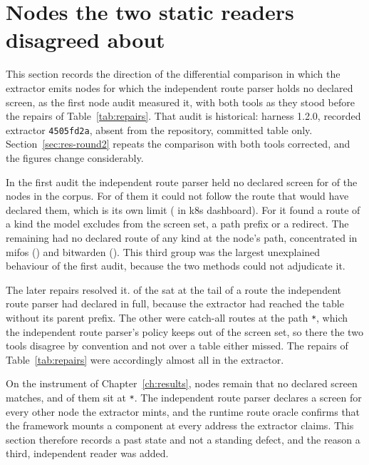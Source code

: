 \section{Nodes the two static readers disagreed about}
\label{app:readers}

This section records the direction of the differential comparison in which the extractor emits nodes for which the independent route parser holds no declared screen, as the first node audit measured it, with both tools as they stood before the repairs of Table~\ref{tab:repairs}. That audit is historical: harness 1.2.0, recorded extractor \texttt{4505fd2a}, absent from the repository, committed table only. Section~\ref{sec:res-round2} repeats the comparison with both tools corrected, and the figures change considerably.

In the first audit the independent route parser held no declared screen for \NodeAuditUnmatchedAll{} of the \NodeAuditGraphNodesAll{} nodes in the corpus. For \NodeAuditBlindAll{} of them it could not follow the route that would have declared them, which is its own limit (\NodeAuditBlindKdash{} in k8s dashboard). For \NodeAuditOutsideSAll{} it found a route of a kind the model excludes from the screen set, a path prefix or a redirect. The remaining \RoundTwoFirstRoundExtra{} had no declared route of any kind at the node's path, concentrated in mifos (\NodeAuditNoRouteMifos{}) and bitwarden (\NodeAuditNoRouteBitwarden{}). This third group was the largest unexplained behaviour of the first audit, because the two methods could not adjudicate it.

The later repairs resolved it. \RoundTwoFirstRoundTruncated{} of the \RoundTwoFirstRoundExtra{} sat at the tail of a route the independent route parser had declared in full, because the extractor had reached the table without its parent prefix. The other \RoundTwoFirstRoundSynthetic{} were catch-all routes at the path \texttt{*}, which the independent route parser's policy keeps out of the screen set, so there the two tools disagree by convention and not over a table either missed. The repairs of Table~\ref{tab:repairs} were accordingly almost all in the extractor.

On the instrument of Chapter~\ref{ch:results}, \RoundTwoExtraNodes{} nodes remain that no declared screen matches, and \RoundTwoExtraNodesWildcard{} of them sit at \texttt{*}. The independent route parser declares a screen for every other node the extractor mints, and the runtime route oracle confirms that the framework mounts a component at every address the extractor claims. This section therefore records a past state and not a standing defect, and the reason a third, independent reader was added.

